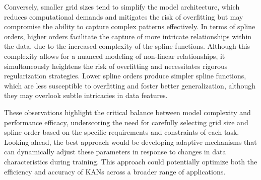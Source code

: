 \documentclass{article}
\begin{document}
Conversely, smaller grid sizes tend to simplify the model architecture,
which reduces computational demands and mitigates the risk of overfitting but may compromise the ability to capture complex patterns effectively.
In terms of spline orders, higher orders facilitate the capture of more intricate relationships within the data,
due to the increased complexity of the spline functions.
Although this complexity allows for a nuanced modeling of non-linear relationships, it simultaneously heightens the risk of overfitting and necessitates rigorous regularization strategies.
Lower spline orders produce simpler spline functions, which are less susceptible to overfitting and foster better generalization,
although they may overlook subtle intricacies in data features.

These observations highlight the critical balance between model complexity and performance efficacy,
underscoring the need for carefully selecting grid size and spline order based on the specific requirements and constraints of each task.
Looking ahead, the best approach would be developing adaptive mechanisms that can dynamically adjust these parameters in response to changes in data characteristics during training.
This approach could potentially optimize both the efficiency and accuracy of KANs across a broader range of applications.

\clearpage %





\end{document}
